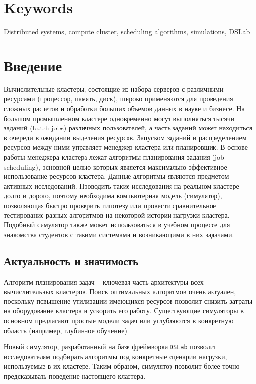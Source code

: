 \vspace{-0.5cm}
\section*{Keywords}
Distributed systems, compute cluster, scheduling algorithms, simulations, DSLab 

\newpage 

\section{Введение}

Вычислительные кластеры, состоящие из набора серверов с различными ресурсами (процессор, память, диск), широко применяются для проведения сложных расчетов и обработки больших объемов данных в науке и бизнесе. На большом промышленном кластере одновременно могут выполняться тысячи заданий (batch jobs) различных пользователей, а часть заданий может находиться в очереди в ожидании выделения ресурсов. Запуском заданий и распределением ресурсов между ними управляет менеджер кластера или планировщик. В основе работы менеджера кластера лежат алгоритмы планирования задания (job scheduling), основной целью которых является максимально эффективное использование ресурсов кластера. Данные алгоритмы являются предметом активных исследований. Проводить такие исследования на реальном кластере долго и дорого, поэтому необходима компьютерная модель (симулятор), позволяющая быстро проверить гипотезу или провести сравнительное тестирование разных алгоритмов на некоторой истории нагрузки кластера. Подобный симулятор также может использоваться в учебном процессе для знакомства студентов с такими системами и возникающими в них задачами.

\subsection{Актуальность и значимость}

Алгоритм планирования задач -- ключевая часть архитектуры всех вычислительных кластеров. Поиск оптимальных алгоритмов очень актуален, поскольку повышение утилизации имеющихся ресурсов позволит снизить затраты на оборудование кластера и ускорить его работу. Существующие симуляторы в основном предлагают простые модели задач или углубляются в конкретную область (например, глубинное обучение). 

Новый симулятор, разработанный на базе фреймворка \texttt{DSLab} позволит исследователям подбирать алгоритмы под конкретные сценарии нагрузки, используемые в их кластере. Таким образом, симулятор позволит более точно предсказывать поведение настоящего кластера.  

